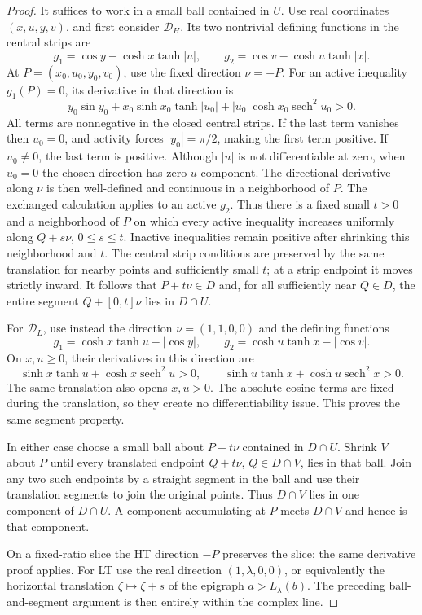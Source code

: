 \documentclass[11pt]{article}
\numberwithin{equation}{section}
\theoremstyle{definition}
\renewcommand{\DH}{\mathcal D_H}
\newcommand{\DL}{\mathcal D_L}
\begin{document}
\begin{proof}
It suffices to work in a small ball contained in \(U\).
Use real coordinates \((x,u,y,v)\), and first consider
\(\DH\).  Its two nontrivial defining functions in the
central strips are
\[
 g_1=\cos y-\cosh x\tanh|u|,\qquad
 g_2=\cos v-\cosh u\tanh|x|.
\]
At \(P=(x_0,u_0,y_0,v_0)\), use the fixed direction
\(\nu=-P\).  For an active inequality \(g_1(P)=0\),
its derivative in that direction is
\begin{equation}\label{geo:inward-derivative}
 y_0\sin y_0+
 x_0\sinh x_0\tanh|u_0|+
 |u_0|\cosh x_0\operatorname{sech}^2u_0>0.
\end{equation}
All terms are nonnegative in the closed central strips.
If the last term vanishes then \(u_0=0\), and activity
forces \(|y_0|=\pi/2\), making the first term positive.
If \(u_0\ne0\), the last term is positive.
Although \(|u|\) is not differentiable at zero, when
\(u_0=0\) the chosen direction has zero \(u\) component.
The directional derivative along \(\nu\) is then
well-defined and continuous in a neighborhood of \(P\).
The exchanged calculation applies to an active \(g_2\).
Thus there is a fixed small \(t>0\) and a neighborhood
of \(P\) on which every active inequality increases
uniformly along \(Q+s\nu\), \(0\leq s\leq t\).
Inactive inequalities remain positive after shrinking
this neighborhood and \(t\).  The central strip
conditions are preserved by the same translation
for nearby points and sufficiently small \(t\);
at a strip endpoint it moves strictly inward.
It follows that \(P+t\nu\in D\) and, for all
sufficiently near \(Q\in D\), the entire segment
\(Q+[0,t]\nu\) lies in \(D\cap U\).

For \(\DL\), use instead the direction
\(\nu=(1,1,0,0)\) and the defining functions
\[
 g_1=\cosh x\tanh u-|\cos y|,\qquad
 g_2=\cosh u\tanh x-|\cos v|.
\]
On \(x,u\geq0\), their derivatives in this direction are
\[
 \sinh x\tanh u+\cosh x\operatorname{sech}^2u>0,
 \qquad
 \sinh u\tanh x+\cosh u\operatorname{sech}^2x>0.
\]
The same translation also opens \(x,u>0\).
The absolute cosine terms are fixed during the
translation, so they create no differentiability issue.
This proves the same segment property.

In either case choose a small ball about \(P+t\nu\)
contained in \(D\cap U\).  Shrink \(V\) about \(P\)
until every translated endpoint \(Q+t\nu\), \(Q\in D\cap V\),
lies in that ball.  Join any two such endpoints by a
straight segment in the ball and use their translation
segments to join the original points.  Thus \(D\cap V\)
lies in one component of \(D\cap U\).
A component accumulating at \(P\) meets \(D\cap V\)
and hence is that component.

On a fixed-ratio slice the HT direction \(-P\)
preserves the slice; the same derivative proof applies.
For LT use the real direction
\((1,\lambda,0,0)\), or equivalently the horizontal
translation \(\zeta\mapsto\zeta+s\) of the epigraph
\(a>L_\lambda(b)\).  The preceding ball-and-segment
argument is then entirely within the complex line.
\end{proof}
\end{document}
